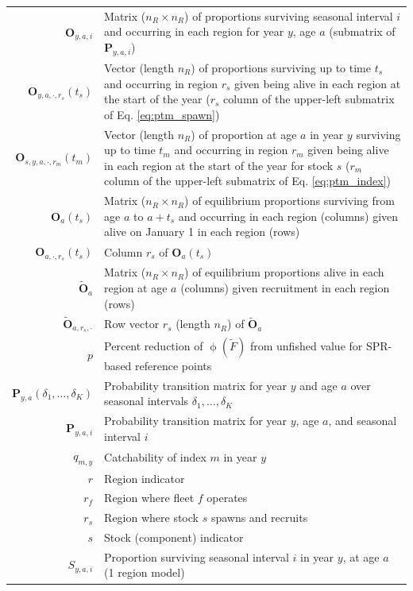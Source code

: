\documentclass[
]{article}
\begin{document}
\begin{longtable}[c]{r p{}}
$\mathbf{O}_{y,a,i}$ & Matrix ($n_R \times n_R$) of proportions surviving seasonal interval $i$ and occurring in each region for year $y$, age $a$ (submatrix of $\mathbf{P}_{y,a,i}$)\\
$\mathbf{O}_{y,a,\cdot,r_s}(t_s)$ & Vector (length $n_R$) of proportions surviving up to time $t_s$ and occurring in region $r_s$ given being alive in each region at the start of the year ($r_s$ column of the upper-left submatrix of Eq. \ref{eq:ptm_spawn})\\
$\mathbf{O}_{s,y,a,\cdot,r_m}(t_m)$ & Vector (length $n_R$) of proportion at age $a$ in year $y$ surviving up to time $t_m$ and occurring in region $r_m$ given being alive in each region at the start of the year for stock $s$ ($r_m$ column of the upper-left submatrix of Eq. \ref{eq:ptm_index})\\
$\mathbf{O}_{a}(t_s)$ & Matrix ($n_R \times n_R$) of equilibrium proportions surviving from age $a$ to $a+t_s$ and occurring in each region (columns) given alive on January 1 in each region (rows)\\
$\mathbf{O}_{a,\cdot,r_s}(t_s)$ & Column $r_s$ of $\mathbf{O}_{a}(t_s)$\\
$\widetilde{\mathbf{O}}_{a}$ & Matrix ($n_R \times n_R$) of equilibrium proportions alive in each region at age $a$ (columns) given recruitment in each region (rows)\\
$\widetilde{\mathbf{O}}_{a,r_s,\cdot}$ & Row vector $r_s$ (length $n_R$) of $\widetilde{\mathbf{O}}_{a}$\\
$p$ & Percent reduction of $\upphi(\widetilde{F})$ from unfished value for SPR-based reference points\\ 
$\mathbf{P}_{y,a}(\delta_1,\ldots,\delta_K)$ & Probability transition matrix for year $y$ and age $a$ over seasonal intervals $\delta_1,\ldots, \delta_K$\\
$\mathbf{P}_{y,a,i}$ & Probability transition matrix for year $y$, age $a$, and seasonal interval $i$\\
$q_{m,y}$ & Catchability of index $m$ in year $y$\\
$r$ & Region indicator\\
$r_f$ & Region where fleet $f$ operates\\
$r_s$ & Region where stock $s$ spawns and recruits\\
$s$ & Stock (component) indicator\\
$S_{y,a,i}$ & Proportion surviving seasonal interval $i$ in year $y$, at age $a$ (1 region model)\\

\end{longtable}
\end{document}

